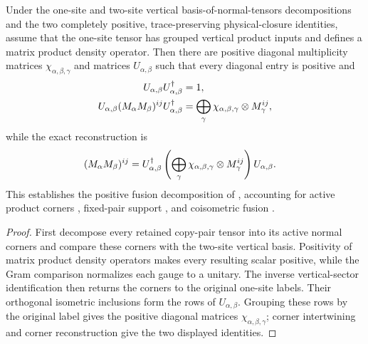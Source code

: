 \begin{lemma}
    \label{thm:mpdo_transported_vertical_product_positive_fusion_decomposition}
    \leanok
    Under the one-site and two-site vertical basis-of-normal-tensors
    decompositions and the two completely positive, trace-preserving
    physical-closure identities, assume that the one-site tensor
    has grouped vertical product inputs and defines a matrix product
    density operator. Then there are positive diagonal multiplicity matrices
    $\chi_{\alpha,\beta,\gamma}$ and matrices $U_{\alpha,\beta}$ such that
    every diagonal entry is positive and
    \begin{align}
        U_{\alpha,\beta}U_{\alpha,\beta}^{\dagger}
         & =1,
        \notag               \\
        U_{\alpha,\beta}(M_\alpha M_\beta)^{ij}
        U_{\alpha,\beta}^{\dagger}
         & =\bigoplus_\gamma
        \chi_{\alpha,\beta,\gamma}\otimes M_\gamma^{ij},
        \notag
    \end{align}
    while the exact reconstruction is
    \begin{align}
        (M_\alpha M_\beta)^{ij}
         & =U_{\alpha,\beta}^{\dagger}
        \left(\bigoplus_\gamma
        \chi_{\alpha,\beta,\gamma}\otimes M_\gamma^{ij}\right)
        U_{\alpha,\beta}.
        \notag
    \end{align}
    This establishes the positive fusion decomposition of
    \cite[Appendix~C.4, lines~2020--2029]{Cirac2016MPDO_arXiv}, accounting for
    active product corners \cite{gap:cpsv16_bnt_uniqueness_zero_coefficient},
    fixed-pair support \cite{gap:cpsv16_figure11_per_pair_support}, and
    coisometric fusion \cite{gap:cpsv16_figure11_fusion_coisometry}.
\end{lemma}

\begin{proof}\leanok
    First decompose every retained copy-pair tensor into its active normal
    corners and compare these corners with the two-site vertical basis.
    Positivity of matrix product density operators makes every resulting
    scalar positive, while the Gram comparison normalizes each gauge to a
    unitary. The inverse vertical-sector identification then returns the corners
    to the original one-site labels. Their orthogonal isometric inclusions
    form the rows of $U_{\alpha,\beta}$. Grouping these rows by the original
    label gives the positive diagonal matrices $\chi_{\alpha,\beta,\gamma}$;
    corner intertwining and corner reconstruction give the two displayed
    identities.
\end{proof}

